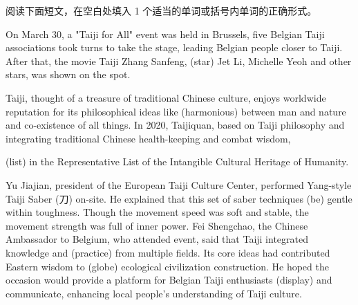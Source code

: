 \documentclass{英语试卷}
\begin{document}
\par 阅读下面短文，在空白处填入 1 个适当的单词或括号内单词的正确形式。\par
\par On March 30, a "Taiji for All" event was held in Brussels, \blanknum{} five Belgian Taiji associations took turns to take the stage, leading Belgian people closer to Taiji. After that, the movie Taiji Zhang Sanfeng, \blanknum{} (star) Jet Li, Michelle Yeoh and other stars, was shown on the spot.\par
\par Taiji, thought of  a treasure of traditional Chinese culture, enjoys worldwide reputation for its philosophical ideas like  (harmonious) between man and nature and co-existence of all things. In 2020, Taijiquan, based on Taiji philosophy and integrating traditional Chinese health-keeping and combat wisdom,\par
\par {} (list) in the Representative List of the Intangible Cultural Heritage of Humanity.\par
\par Yu Jiajian, president of the European Taiji Culture Center, performed Yang-style Taiji Saber (刀) on-site. He explained that this set of saber techniques  (be) gentle within toughness. Though the movement speed was soft and stable, the movement strength was full of inner power. Fei Shengchao, the Chinese Ambassador to Belgium, who attended  event, said that Taiji integrated knowledge and  (practice) from multiple fields. Its core ideas had contributed Eastern wisdom to  (globe) ecological civilization construction. He hoped the occasion would provide a platform for Belgian Taiji enthusiasts  (display) and communicate, enhancing local people's understanding of Taiji culture.\par
\end{document}
